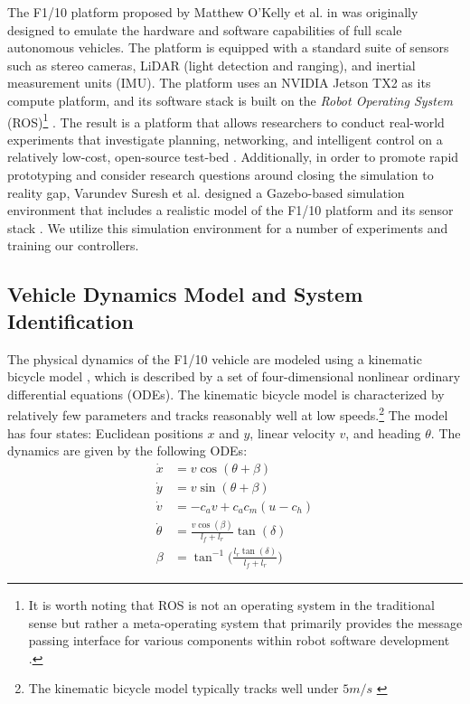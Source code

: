 \documentclass[manuscript,screen,review]{acmart}
\newcommand{\todo}[1]{\textcolor{red}{\textbf{\underline{TODO:}} #1}}
\begin{document}
The F1/10 platform proposed by Matthew O'Kelly et al. in \cite{F1102019} was originally designed to emulate the hardware and software capabilities of full scale autonomous vehicles. The platform is equipped with a standard suite of sensors such as stereo cameras, LiDAR (light detection and ranging), and inertial measurement units (IMU). The platform uses an NVIDIA Jetson TX2 as its compute platform, and its software stack is built on the \emph{Robot Operating System} (ROS)\footnote{It is worth noting that ROS is not an operating system in the traditional sense but rather a meta-operating system that primarily provides the message passing interface for various components within robot software development \cite{Huang2014}.} \cite{ROS}. The result is a platform that allows researchers to conduct real-world experiments that investigate planning, networking, and intelligent control on a relatively low-cost, open-source test-bed \cite{F1102019}. Additionally, in order to promote rapid prototyping and consider research questions around closing the simulation to reality gap\cite{Muratore2019}, Varundev Suresh et al. designed a Gazebo-based simulation environment \cite{Gazebo} that includes a realistic model of the F1/10 platform and its sensor stack \cite{varundev_ros_19}. We utilize this simulation environment for a number of experiments and training our controllers.


\subsection{Vehicle Dynamics Model and System Identification}



The physical dynamics of the F1/10 vehicle are modeled using a kinematic bicycle model \cite{Rajamani2012}, which is described by a set of four-dimensional nonlinear ordinary differential equations (ODEs). The kinematic bicycle model is characterized by relatively few parameters and tracks reasonably well at low speeds.\footnote{ The kinematic bicycle model typically tracks well under $5 m/s$ \cite{ivanov2020case}} The model has four states: Euclidean positions $x$ and $y$, linear velocity $v$, and heading $\theta$. The dynamics are given by the following ODEs: 
\begin{align*}
    \Dot{x} & = v\cos(\theta +\beta)\\
    \Dot{y} & = v\sin(\theta + \beta)\\
    \Dot{v} & = -c_av +c_ac_m(u-c_h)\\
    \Dot{\theta} & = \frac{v\cos(\beta)}{l_f+l_r}\tan(\delta)\\
    \beta &= \tan^{-1}\Big(\frac{l_r\tan(\delta)}{l_f+l_r}\Big)
\end{align*}
\end{document}
